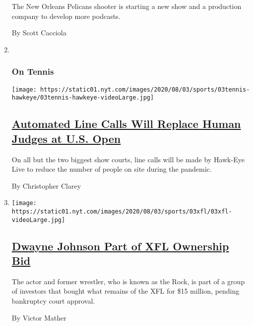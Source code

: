 \begin{enumerate}
  The New Orleans Pelicans shooter is starting a new show and a
  production company to develop more podcasts.

  By Scott Cacciola
\item ~
  \hypertarget{on-tennis}{%
  \subsubsection{On Tennis}\label{on-tennis}}

  \texttt{[image: https://static01.nyt.com/images/2020/08/03/sports/03tennis-hawkeye/03tennis-hawkeye-videoLarge.jpg]}

  \hypertarget{automated-line-calls-will-replace-human-judges-at-us-open}{%
  \subsection{\texorpdfstring{\href{/2020/08/03/sports/tennis/us-open-hawkeye-line-judges.html}{Automated
  Line Calls Will Replace Human Judges at U.S.
  Open}}{Automated Line Calls Will Replace Human Judges at U.S. Open}}\label{automated-line-calls-will-replace-human-judges-at-us-open}}

  On all but the two biggest show courts, line calls will be made by
  Hawk-Eye Live to reduce the number of people on site during the
  pandemic.

  By Christopher Clarey
\item
  \texttt{[image: https://static01.nyt.com/images/2020/08/03/sports/03xfl/03xfl-videoLarge.jpg]}

  \hypertarget{dwayne-johnson-part-of-xfl-ownership-bid}{%
  \subsection{\texorpdfstring{\href{/2020/08/03/sports/football/xfl-the-rock-dwayne-johnson.html}{Dwayne
  Johnson Part of XFL Ownership
  Bid}}{Dwayne Johnson Part of XFL Ownership Bid}}\label{dwayne-johnson-part-of-xfl-ownership-bid}}

  The actor and former wrestler, who is known as the Rock, is part of a
  group of investors that bought what remains of the XFL for \$15
  million, pending bankruptcy court approval.

  By Victor Mather
\end{enumerate}


